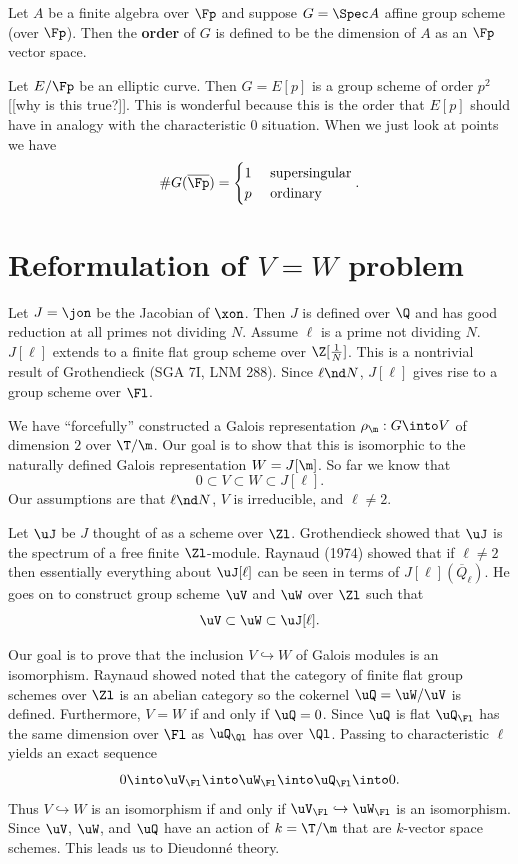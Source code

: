 \documentclass{report}
\begin{document}
Let $A$ be a finite algebra over $\Fp$ and suppose $G=\Spec A$
affine group scheme (over $\Fp$). Then the {\bfseries order} of
$G$ is defined to be the dimension of $A$ as an $\Fp$ vector space.

\begin{example} Let $E/\Fp$ be an elliptic curve. Then $G=E[p]$
is a group scheme of order $p^2$ [[why is this true?]].
This is wonderful because this is the order that $E[p]$
should have in analogy with the characteristic $0$ situation.
When we just look at points we have
$$\#G(\overline{\Fp})=\begin{cases}1&\text{ supersingular}\\
                                   p&\text{ ordinary}\end{cases}.$$
\end{example}

\section{Reformulation of $V=W$ problem}
Let $J=\jon$ be the Jacobian of $\xon$. Then $J$ is defined over $\Q$
and has good reduction at all primes not dividing $N$. Assume $\ell$
is a prime not dividing $N$. $J[\ell]$ extends to a finite flat group
scheme over $\Z[\frac{1}{N}]$. This is a nontrivial result of Grothendieck
(SGA 7I, LNM 288). Since $\ell\nd N$, $J[\ell]$ gives rise to
a group scheme over $\Fl$.

We have ``forcefully'' constructed a Galois representation
$\rho_\m:G\into V$ of dimension $2$ over $\T/\m$. Our goal is to show that
this is isomorphic to the naturally defined Galois representation
$W=J[\m]$. So far we know that $$0\subset V\subset W\subset J[\ell].$$
Our assumptions are that $\ell\nd N$, $V$ is irreducible, and $\ell\neq 2$.

Let $\uJ$ be $J$ thought of as a scheme over $\Zl$. Grothendieck showed
that $\uJ$ is the spectrum of a free finite $\Zl$-module. Raynaud (1974)
showed that if $\ell\neq 2$ then essentially everything about
$\uJ[\ell]$ can be seen in terms of $J[\ell](\overline{Q}_{\ell})$.
He goes on to construct group scheme $\uV$ and $\uW$ over $\Zl$
such that $$\uV\subset\uW\subset\uJ[\ell].$$

Our goal is to prove that the inclusion $V\hookrightarrow W$ of
Galois modules is an isomorphism. Raynaud showed noted that the category
of finite flat group schemes over $\Zl$ is an abelian category so
the cokernel $\uQ=\uW/\uV$ is defined. Furthermore, $V=W$ if and only if $\uQ=0$.
Since $\uQ$ is flat $\uQ_{\Fl}$ has the same dimension over $\Fl$
as $\uQ_{\Ql}$ has over $\Ql$. Passing to characteristic $\ell$ yields
an exact sequence
$$0\into \uV_{\Fl}\into \uW_{\Fl}\into \uQ_{\Fl}\into 0.$$
Thus $V\hookrightarrow W$ is an isomorphism if and only if $\uV_{\Fl}\hookrightarrow
\uW_{\Fl}$ is an isomorphism. Since $\uV$, $\uW$, and $\uQ$ have an action
of $k=\T/\m$ that are $k$-vector space schemes. This leads us to
Dieudonn\'{e} theory.
\end{document}
